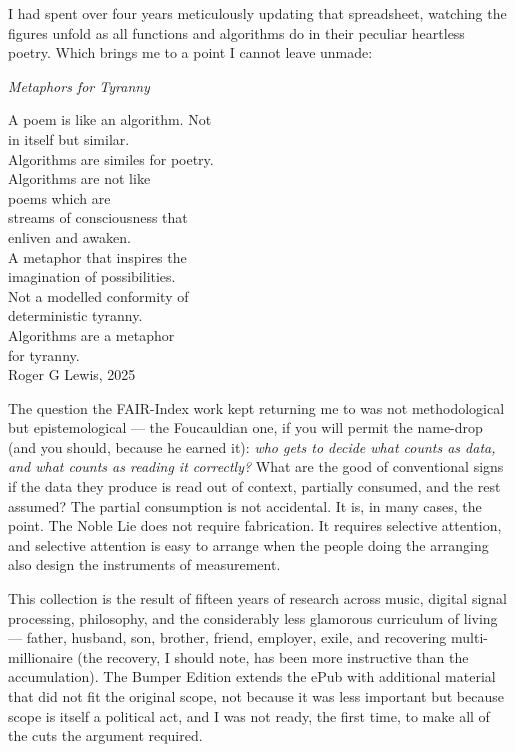 I had spent over four years meticulously updating that spreadsheet,
watching the figures unfold as all functions and algorithms do in their
peculiar heartless poetry. Which brings me to a point I cannot leave
unmade:

\bigskip
\begin{center}
\itshape
Metaphors for Tyranny

\medskip
A poem is like an algorithm. Not\\
in itself but similar.\\
Algorithms are similes for poetry.\\[6pt]
Algorithms are not like\\
poems which are\\
streams of consciousness that\\
enliven and awaken.\\[6pt]
A metaphor that inspires the\\
imagination of possibilities.\\
Not a modelled conformity of\\
deterministic tyranny.\\
Algorithms are a metaphor\\
for tyranny.\\[6pt]
Roger G Lewis, 2025
\end{center}
\bigskip

The question the FAIR-Index work kept returning me to was not
methodological but epistemological --- the Foucauldian one, if you will
permit the name-drop (and you should, because he earned it): \textit{who gets
to decide what counts as data, and what counts as reading it correctly?}
What are the good of conventional signs if the data they produce is
read out of context, partially consumed, and the rest assumed? The
partial consumption is not accidental. It is, in many cases, the
point. The Noble Lie does not require fabrication. It requires
selective attention, and selective attention is easy to arrange when
the people doing the arranging also design the instruments of
measurement.

This collection is the result of fifteen years of research across
music, digital signal processing, philosophy, and the considerably
less glamorous curriculum of living --- father, husband, son, brother,
friend, employer, exile, and recovering multi-millionaire (the
recovery, I should note, has been more instructive than the
accumulation). The Bumper Edition extends the ePub with additional
material that did not fit the original scope, not because it was less
important but because scope is itself a political act, and I was not
ready, the first time, to make all of the cuts the argument required.

